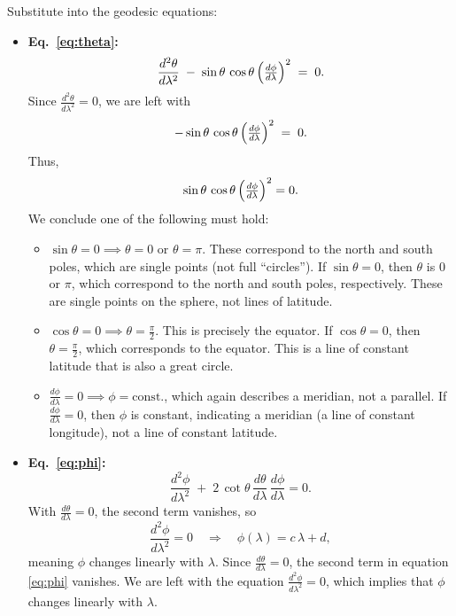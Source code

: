\documentclass{article}
\begin{document}
Substitute into the geodesic equations:

\begin{itemize}
\item \textbf{Eq.~\eqref{eq:theta}:}
\[
\frac{d^2 \theta}{d\lambda^2}
\;-\;
\sin\theta \,\cos\theta \,\Bigl(\tfrac{d\phi}{d\lambda}\Bigr)^2
\;=\; 0.
\]
Since \(\tfrac{d^2\theta}{d\lambda^2} = 0\), we are left with
\[
-\sin\theta \,\cos\theta \,\Bigl(\tfrac{d\phi}{d\lambda}\Bigr)^2
\;=\;
0.
\]
Thus,
\[
\sin\theta\,\cos\theta\,\Bigl(\tfrac{d\phi}{d\lambda}\Bigr)^2 = 0.
\]
We conclude one of the following must hold:

\begin{itemize}
\item \(\sin\theta = 0 \implies \theta=0 \text{ or } \theta=\pi\). These correspond to the north and south poles, which are single points (not full ``circles''). If \(\sin\theta = 0\), then \(\theta\) is \(0\) or \(\pi\), which correspond to the north and south poles, respectively. These are single points on the sphere, not lines of latitude.

\item \(\cos\theta = 0 \implies \theta = \tfrac{\pi}{2}\). This is precisely the equator. If \(\cos\theta = 0\), then \(\theta = \tfrac{\pi}{2}\), which corresponds to the equator. This is a line of constant latitude that is also a great circle.

\item \(\tfrac{d\phi}{d\lambda} = 0 \implies \phi=\text{const.}\), which again describes a meridian, not a parallel. If \(\tfrac{d\phi}{d\lambda} = 0\), then \(\phi\) is constant, indicating a meridian (a line of constant longitude), not a line of constant latitude.
\end{itemize}

\item \textbf{Eq.~\eqref{eq:phi}:}
\[
\frac{d^2 \phi}{d\lambda^2}
\;+\;
2 \,\cot\theta\,\frac{d\theta}{d\lambda}\,\frac{d\phi}{d\lambda}
= 0.
\]
With \(\tfrac{d\theta}{d\lambda} = 0\), the second term vanishes, so
\[
\frac{d^2 \phi}{d\lambda^2} = 0
\quad\Longrightarrow\quad
\phi(\lambda) = c\,\lambda + d,
\]
meaning \(\phi\) changes linearly with \(\lambda\). Since \(\tfrac{d\theta}{d\lambda} = 0\), the second term in equation \eqref{eq:phi} vanishes. We are left with the equation \(\tfrac{d^2 \phi}{d\lambda^2} = 0\), which implies that \(\phi\) changes linearly with \(\lambda\).
\end{itemize}
\end{document}
